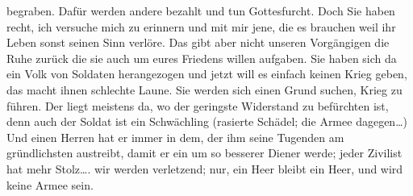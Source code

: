 \documentclass[
]{article}
\begin{document}
\begin{itemize}
  begraben. Dafür werden andere bezahlt und tun Gottesfurcht. Doch Sie
  haben recht, ich versuche mich zu erinnern und mit mir jene, die es
  brauchen weil ihr Leben sonst seinen Sinn verlöre. Das gibt aber nicht
  unseren Vorgängigen die Ruhe zurück die sie auch um eures Friedens
  willen aufgaben. Sie haben sich da ein Volk von Soldaten herangezogen
  und jetzt will es einfach keinen Krieg geben, das macht ihnen
  schlechte Laune. Sie werden sich einen Grund suchen, Krieg zu führen.
  Der liegt meistens da, wo der geringste Widerstand zu befürchten ist,
  denn auch der Soldat ist ein Schwächling (rasierte Schädel; die Armee
  dagegen\ldots) Und einen Herren hat er immer in dem, der ihm seine
  Tugenden am gründlichsten austreibt, damit er ein um so besserer
  Diener werde; jeder Zivilist hat mehr Stolz\ldots. wir werden
  verletzend; nur, ein Heer bleibt ein Heer, und wird keine Armee sein.
\end{itemize}
\end{document}

